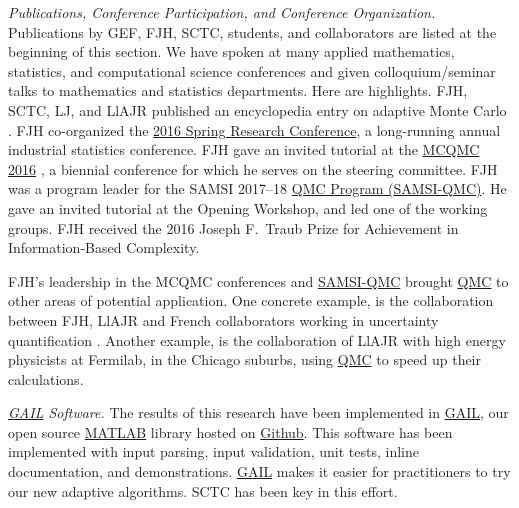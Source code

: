 \documentclass[11pt]{NSFamsart}
\newcommand{\GAIL}{\hyperlink{GAILlink}{GAIL}\xspace}
\newcommand{\QMC}{\hyperlink{QMClink}{QMC}\xspace}
\newcommand{\SAMSIQMC}{\hyperlink{SAMSIlink}{SAMSI-QMC}\xspace}
\newcommand{\MATLAB}{\hyperlink{MATLABlink}{MATLAB}\xspace}
\newcommand{\Rlang}{\hyperlink{Rlink}{R}\xspace}
\begin{document}
\emph{Publications, Conference Participation, and Conference Organization.} Publications by GEF, FJH,  SCTC, students, and collaborators are listed at the beginning of this section.  We have spoken at many applied mathematics, statistics, 
and computational science conferences and given colloquium/seminar talks to mathematics and 
statistics departments.  Here are highlights.  FJH, SCTC, LJ, and LlAJR published  an 
encyclopedia entry on adaptive Monte Carlo \cite{HicEtal18a}.  FJH co-organized the 
\href{http://cos.iit.edu/2016-spring-research-conference/}{2016 Spring Research 
Conference}, a long-running annual industrial statistics conference.   FJH gave an invited tutorial 
at the \href{http://mcqmc2016.stanford.edu}{MCQMC 2016} 
\cite{Hic17a}, a biennial conference for which he serves on the steering committee.  FJH 
was a program leader for the SAMSI 2017--18 
\href{https://www.samsi.info/programs-and-activities/year-long-research-programs/2017-18-program-quasi-monte-carlo-high-dimensional-sampling-methods-applied-mathematics-qmc/
}{\QMC Program (\hypertarget{SAMSIlink}{SAMSI-QMC})}.   He  gave an invited tutorial 
	at the Opening Workshop, and led one of 
	the working groups.  FJH received the 2016 Joseph F.\ Traub 
	Prize for Achievement in Information-Based Complexity.
	
	
FJH's leadership in the MCQMC conferences  and \SAMSIQMC brought \QMC to other areas of potential application.  One concrete example, is the 
	collaboration between FJH, LlAJR and French collaborators working in uncertainty quantification \cite{GilEtal16a, GilJim16b}.  Another example, is the collaboration of LlAJR with
	high energy physicists at Fermilab, in the Chicago suburbs, using \QMC to speed 
	up their calculations.
	
\emph{\GAIL Software.} The results of this research have been implemented in 
\GAIL, our open source \MATLAB library hosted on
\href{http://gailgithub.github.io/GAIL_Dev/} {Github}. This software 
has been implemented with input parsing, input validation, unit tests, inline documentation, and 
demonstrations.  \GAIL makes it easier for practitioners to try our new adaptive algorithms.  SCTC has been key in this effort.  
\end{document}
